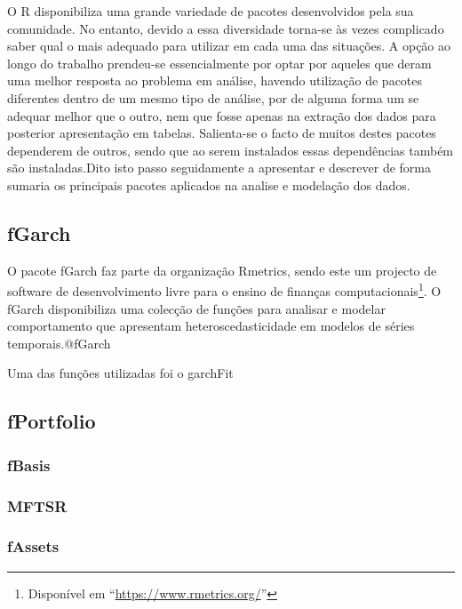 \documentclass[
  12pt,
  a4paper,
  openany]{book}
\begin{document}
O R disponibiliza uma grande variedade de pacotes desenvolvidos pela sua comunidade. No entanto, devido a essa diversidade torna-se às vezes complicado saber qual o mais adequado para utilizar em cada uma das situações. A opção ao longo do trabalho prendeu-se essencialmente por optar por aqueles que deram uma melhor resposta ao problema em análise, havendo utilização de pacotes diferentes dentro de um mesmo tipo de análise, por de alguma forma um se adequar melhor que o outro, nem que fosse apenas na extração dos dados para posterior apresentação em tabelas. Salienta-se o facto de muitos destes pacotes dependerem de outros, sendo que ao serem instalados essas dependências também são instaladas.Dito isto passo seguidamente a apresentar e descrever de forma sumaria os principais pacotes aplicados na analise e modelação dos dados.

\hypertarget{fgarch}{%
\subsection{fGarch}\label{fgarch}}

O pacote fGarch faz parte da organização Rmetrics, sendo este um projecto de software de desenvolvimento livre para o ensino de finanças computacionais\footnote{Disponível em ``\url{https://www.rmetrics.org/}''}. O fGarch disponibiliza uma colecção de funções para analisar e modelar comportamento que apresentam heteroscedasticidade em modelos de séries temporais.@fGarch

Uma das funções utilizadas foi o garchFit

\hypertarget{fportfolio}{%
\subsection{fPortfolio}\label{fportfolio}}

\hypertarget{fbasis}{%
\subsubsection{fBasis}\label{fbasis}}

\hypertarget{mftsr}{%
\subsubsection{MFTSR}\label{mftsr}}

\hypertarget{fassets}{%
\subsubsection{fAssets}\label{fassets}}
\end{document}
